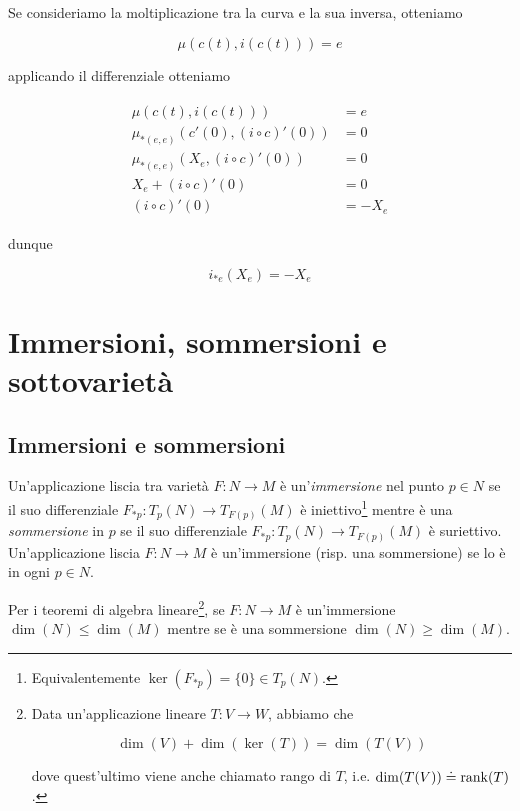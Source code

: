 Se consideriamo la moltiplicazione tra la curva e la sua inversa, otteniamo

\begin{equation}
	\mu(c(t),i(c(t))) = e
\end{equation}

applicando il differenziale otteniamo

\begin{align}
	\begin{split}
		\mu(c(t),i(c(t))) &= e\\
		\mu_{*(e,e)}(c'(0),(i \circ c)'(0)) &= 0\\
		\mu_{*(e,e)}(X_{e},(i \circ c)'(0)) &= 0\\
		X_{e} + (i \circ c)'(0) &= 0\\
		(i \circ c)'(0) &= - X_{e}
	\end{split}
\end{align}

dunque

\begin{equation}
	i_{*e}(X_{e}) = - X_{e}
\end{equation}

\section{Immersioni, sommersioni e sottovarietà}

\subsection{Immersioni e sommersioni}

Un'applicazione liscia tra varietà $ F : N \to M $ è un'\textit{immersione} nel punto $ p \in N $ se il suo differenziale $ F_{*p} : T_{p}(N) \to T_{F(p)}(M) $ è iniettivo\footnote{%
	Equivalentemente $ \ker(F_{*p}) = \{0\} \in T_{p}(N) $.%
} mentre è una \textit{sommersione} in $ p $ se il suo differenziale $ F_{*p} : T_{p}(N) \to T_{F(p)}(M) $ è suriettivo.\\
Un'applicazione liscia $ F : N \to M $ è un'immersione (risp. una sommersione) se lo è in ogni $ p \in N $.

\begin{remark}
	Per i teoremi di algebra lineare\footnote{%
		Data un'applicazione lineare $ T : V \to W $, abbiamo che
		
		\begin{equation*}
			\dim(V) + \dim(\ker(T)) = \dim(T(V))
		\end{equation*}
		
		dove quest'ultimo viene anche chiamato rango di $ T $, i.e. $ \dim(T(V)) \doteq \rank(T) $.%
	}, se $ F : N \to M $ è un'immersione $ \dim(N) \leqslant \dim(M) $ mentre se è una sommersione $ \dim(N) \geqslant \dim(M) $.
\end{remark}

